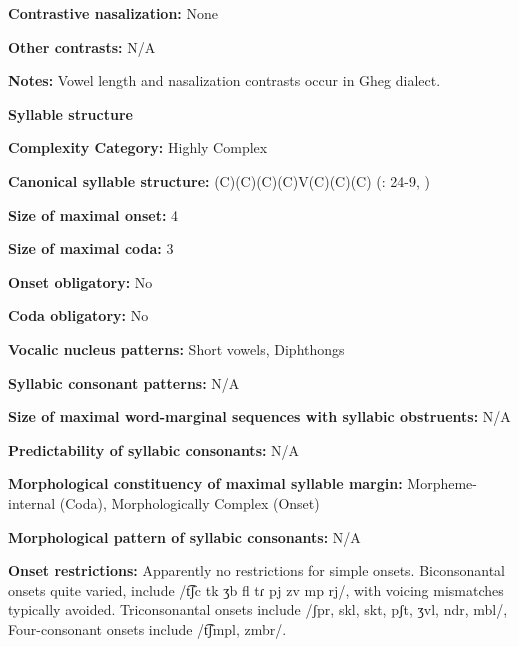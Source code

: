 \textbf{Contrastive nasalization:} None



\textbf{Other contrasts:} N/A



\textbf{Notes:} Vowel length and nasalization contrasts occur in Gheg dialect.



\textbf{Syllable structure}



\textbf{Complexity Category:} Highly Complex



\textbf{Canonical syllable structure:} (C)(C)(C)(C)V(C)(C)(C) (\citealt{Newmark1957}: 24-9, \citealt{Klippenstein2010})



\textbf{Size of maximal onset:} 4



\textbf{Size of maximal coda:} 3



\textbf{Onset obligatory:} No



\textbf{Coda obligatory:} No



\textbf{Vocalic nucleus patterns:} Short vowels, Diphthongs



\textbf{Syllabic consonant patterns:} N/A



\textbf{Size of maximal word{}-marginal sequences with syllabic obstruents:} N/A



\textbf{Predictability of syllabic consonants:} N/A



\textbf{Morphological constituency of maximal syllable margin:} Morpheme-internal (Coda), Morphologically Complex (Onset)



\textbf{Morphological pattern of syllabic consonants:} N/A



\textbf{Onset restrictions:} Apparently no restrictions for simple onsets. Biconsonantal onsets quite varied, include /t͡ʃc tk ʒb fl tɾ pj zv mp rj/, with voicing mismatches typically avoided. Triconsonantal onsets include /ʃpr, skl, skt, pʃt, ʒvl, ndr, mbl/, Four-consonant onsets include /t͡ʃmpl, zmbr/.



